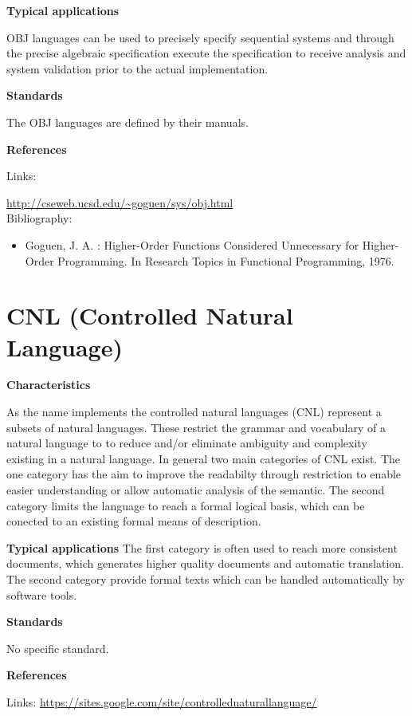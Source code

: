 \documentclass{./template/openetcs_report}
\begin{document}
 	\textbf{Typical applications}

OBJ languages can be used to precisely specify sequential systems and through the precise algebraic specification execute the specification to receive analysis and system validation prior to the actual implementation.

	\textbf{Standards}

The OBJ languages are defined by their manuals.

	\textbf{References}

Links:

\url{http://cseweb.ucsd.edu/~goguen/sys/obj.html} \\[4pt]

Bibliography:

\begin{itemize}
\item Goguen,  J. A. : Higher-Order Functions Considered Unnecessary for Higher-Order Programming. In Research Topics in Functional Programming, 1976.
\end{itemize}


\section{CNL (Controlled Natural Language)}


	\textbf{Characteristics}

As the name implements the controlled natural languages (CNL) represent a  subsets of natural languages. These restrict the grammar and vocabulary of a natural language to to reduce and/or eliminate ambiguity and complexity existing in a natural language. In general two main categories of CNL exist. The one category has the aim to improve the readabilty through restriction to enable easier understanding or allow automatic analysis of the semantic. The second category limits the language to reach a formal logical basis, which can be conected to an existing formal means of description.

	\textbf{Typical applications}
The first category is often used to reach more consistent documents, which generates higher quality documents and automatic translation. The second category provide formal texts which can be handled automatically by software tools.

	\textbf{Standards}

No specific standard.

	\textbf{References}

Links:
\url{https://sites.google.com/site/controllednaturallanguage/} \\[4pt]
\end{document}
